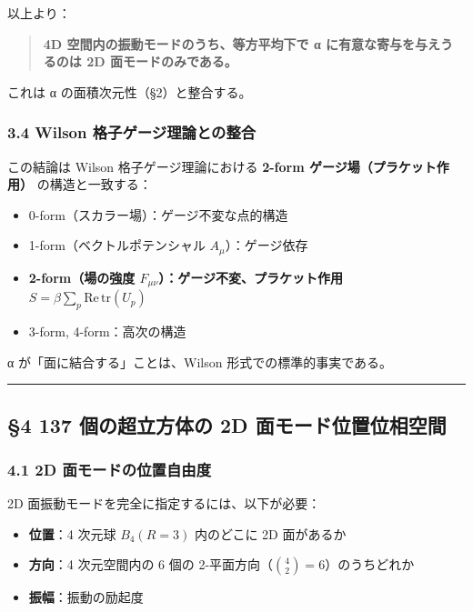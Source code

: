 \documentclass[
  11pt]{ltjsarticle}
\providecommand{\tightlist}{%
  \setlength{\itemsep}{0pt}\setlength{\parskip}{0pt}}
\begin{document}
以上より：

\begin{quote}
\textbf{4D 空間内の振動モードのうち、等方平均下で α
に有意な寄与を与えうるのは 2D 面モードのみである。}
\end{quote}

これは α の面積次元性（§2）と整合する。

\subsubsection{3.4 Wilson
格子ゲージ理論との整合}\label{wilson-ux683cux5b50ux30b2ux30fcux30b8ux7406ux8ad6ux3068ux306eux6574ux5408}

この結論は Wilson 格子ゲージ理論における \textbf{2-form
ゲージ場（プラケット作用）} の構造と一致する：

\begin{itemize}
\tightlist
\item
  0-form（スカラー場）：ゲージ不変な点的構造
\item
  1-form（ベクトルポテンシャル \(A_\mu\)）：ゲージ依存
\item
  \textbf{2-form（場の強度 \(F_{\mu\nu}\)）：ゲージ不変、プラケット作用
  \(S = \beta \sum_p \text{Re}\,\text{tr}(U_p)\)}
\item
  3-form, 4-form：高次の構造
\end{itemize}

α が「面に結合する」ことは、Wilson 形式での標準的事実である。

\begin{center}\rule{0.5\linewidth}{0.5pt}\end{center}

\subsection{§4 137 個の超立方体の 2D
面モード位置位相空間}\label{ux500bux306eux8d85ux7acbux65b9ux4f53ux306e-2d-ux9762ux30e2ux30fcux30c9ux4f4dux7f6eux4f4dux76f8ux7a7aux9593}

\subsubsection{4.1 2D
面モードの位置自由度}\label{d-ux9762ux30e2ux30fcux30c9ux306eux4f4dux7f6eux81eaux7531ux5ea6}

2D 面振動モードを完全に指定するには、以下が必要：

\begin{itemize}
\tightlist
\item
  \textbf{位置}：4 次元球 \(B_4(R=3)\) 内のどこに 2D 面があるか
\item
  \textbf{方向}：4 次元空間内の 6 個の
  2-平面方向（\(\binom{4}{2} = 6\)）のうちどれか
\item
  \textbf{振幅}：振動の励起度
\end{itemize}
\end{document}
